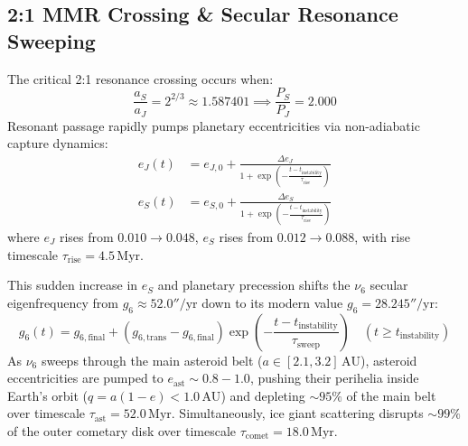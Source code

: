 \documentclass[11pt,a4paper]{article}
\begin{document}
\subsection{2:1 MMR Crossing \& Secular Resonance Sweeping}
The critical 2:1 resonance crossing occurs when:
\begin{equation}
\frac{a_S}{a_J} = 2^{2/3} \approx 1.587401 \implies \frac{P_S}{P_J} = 2.000
\end{equation}
Resonant passage rapidly pumps planetary eccentricities via non-adiabatic capture dynamics:
\begin{align}
e_J(t) &= e_{J,0} + \frac{\Delta e_J}{1 + \exp\left(-\frac{t - t_{\text{instability}}}{\tau_{\text{rise}}}\right)} \\
e_S(t) &= e_{S,0} + \frac{\Delta e_S}{1 + \exp\left(-\frac{t - t_{\text{instability}}}{\tau_{\text{rise}}}\right)}
\end{align}
where $e_J$ rises from $0.010 \to 0.048$, $e_S$ rises from $0.012 \to 0.088$, with rise timescale $\tau_{\text{rise}} = 4.5\,\text{Myr}$.

This sudden increase in $e_S$ and planetary precession shifts the $\nu_6$ secular eigenfrequency from $g_6 \approx 52.0''/\text{yr}$ down to its modern value $g_6 = 28.245''/\text{yr}$:
\begin{equation}
g_6(t) = g_{6,\text{final}} + (g_{6,\text{trans}} - g_{6,\text{final}}) \exp\left(-\frac{t - t_{\text{instability}}}{\tau_{\text{sweep}}}\right) \quad (t \ge t_{\text{instability}})
\end{equation}
As $\nu_6$ sweeps through the main asteroid belt ($a \in [2.1, 3.2]\,\text{AU}$), asteroid eccentricities are pumped to $e_{\text{ast}} \sim 0.8 - 1.0$, pushing their perihelia inside Earth's orbit ($q = a(1-e) < 1.0\,\text{AU}$) and depleting $\sim 95\%$ of the main belt over timescale $\tau_{\text{ast}} = 52.0\,\text{Myr}$. Simultaneously, ice giant scattering disrupts $\sim 99\%$ of the outer cometary disk over timescale $\tau_{\text{comet}} = 18.0\,\text{Myr}$.
\end{document}
